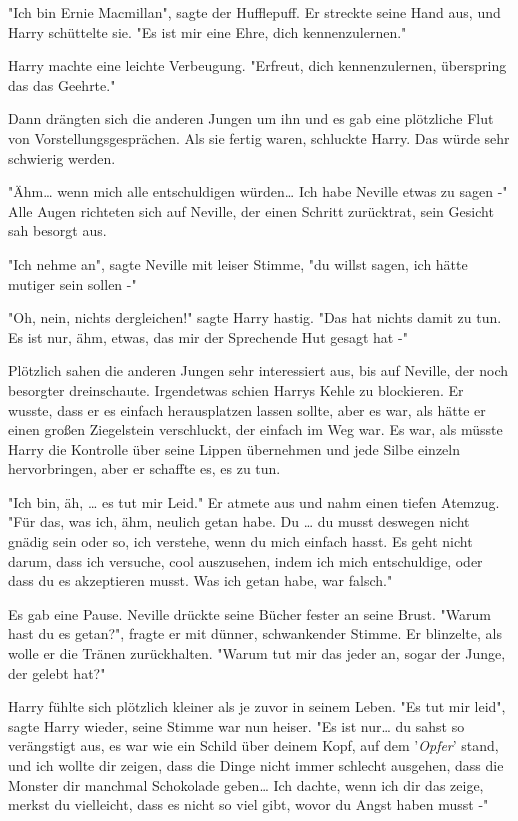 {"Ich bin Ernie Macmillan", sagte der Hufflepuff. Er streckte seine Hand aus, und Harry schüttelte sie. "Es ist mir eine Ehre, dich kennenzulernen."

Harry machte eine leichte Verbeugung. "Erfreut, dich kennenzulernen, überspring das das Geehrte."

Dann drängten sich die anderen Jungen um ihn und es gab eine plötzliche Flut von Vorstellungsgesprächen. Als sie fertig waren, schluckte Harry. Das würde sehr schwierig werden.

"Ähm… wenn mich alle entschuldigen würden… Ich habe Neville etwas zu sagen -" Alle Augen richteten sich auf Neville, der einen Schritt zurücktrat, sein Gesicht sah besorgt aus.

"Ich nehme an", sagte Neville mit leiser Stimme, "du willst sagen, ich hätte mutiger sein sollen -"

"Oh, nein, nichts dergleichen!" sagte Harry hastig. "Das hat nichts damit zu tun. Es ist nur, ähm, etwas, das mir der Sprechende Hut gesagt hat -"

Plötzlich sahen die anderen Jungen sehr interessiert aus, bis auf Neville, der noch besorgter dreinschaute. Irgendetwas schien Harrys Kehle zu blockieren. Er wusste, dass er es einfach herausplatzen lassen sollte, aber es war, als hätte er einen großen Ziegelstein verschluckt, der einfach im Weg war. Es war, als müsste Harry die Kontrolle über seine Lippen übernehmen und jede Silbe einzeln hervorbringen, aber er schaffte es, es zu tun.

"Ich bin, äh, … es tut mir Leid." Er atmete aus und nahm einen tiefen Atemzug. "Für das, was ich, ähm, neulich getan habe. Du … du musst deswegen nicht gnädig sein oder so, ich verstehe, wenn du mich einfach hasst. Es geht nicht darum, dass ich versuche, cool auszusehen, indem ich mich entschuldige, oder dass du es akzeptieren musst. Was ich getan habe, war falsch."

Es gab eine Pause. Neville drückte seine Bücher fester an seine Brust. "Warum hast du es getan?", fragte er mit dünner, schwankender Stimme. Er blinzelte, als wolle er die Tränen zurückhalten. "Warum tut mir das jeder an, sogar der Junge, der gelebt hat?"

Harry fühlte sich plötzlich kleiner als je zuvor in seinem Leben. "Es tut mir leid", sagte Harry wieder, seine Stimme war nun heiser. "Es ist nur… du sahst so verängstigt aus, es war wie ein Schild über deinem Kopf, auf dem '\emph{Opfer}' stand, und ich wollte dir zeigen, dass die Dinge nicht immer schlecht ausgehen, dass die Monster dir manchmal Schokolade geben… Ich dachte, wenn ich dir das zeige, merkst du vielleicht, dass es nicht so viel gibt, wovor du Angst haben musst -"

}
